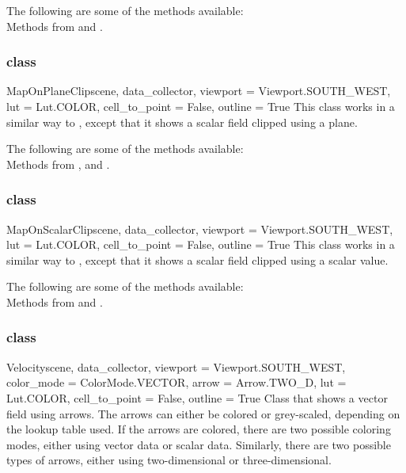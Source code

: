 The following are some of the methods available:\\
Methods from \ActorThreeD and \Transform.

\subsubsection{\MapOnPlaneClip class}

\begin{classdesc}{MapOnPlaneClip}{scene, data_collector,
viewport = Viewport.SOUTH_WEST, lut = Lut.COLOR, cell_to_point = False, 
outline = True}
This class works in a similar way to \MapOnPlaneCut, except that it shows a 
scalar field clipped using a plane. 
\end{classdesc}

The following are some of the methods available:\\
Methods from \ActorThreeD, \Transform and \Clipper.

\subsubsection{\MapOnScalarClip class}

\begin{classdesc}{MapOnScalarClip}{scene, data_collector, 
viewport = Viewport.SOUTH_WEST, lut = Lut.COLOR, cell_to_point = False, 
outline = True}
This class works in a similar way to \Map, except that it shows a scalar 
field clipped using a scalar value. 
\end{classdesc}

The following are some of the methods available:\\
Methods from \ActorThreeD and \Clipper.

\subsubsection{\Velocity class}

\begin{classdesc}{Velocity}{scene, data_collector, 
viewport = Viewport.SOUTH_WEST, color_mode = ColorMode.VECTOR, 
arrow = Arrow.TWO_D, lut = Lut.COLOR, cell_to_point = False, outline = True}
Class that shows a vector field using arrows. The arrows can either be 
colored or grey-scaled, depending on the lookup table used. If the arrows 
are colored, there are two possible coloring modes, either using vector data or 
scalar data. Similarly, there are two possible types of arrows, either 
using two-dimensional or three-dimensional.
\end{classdesc}

